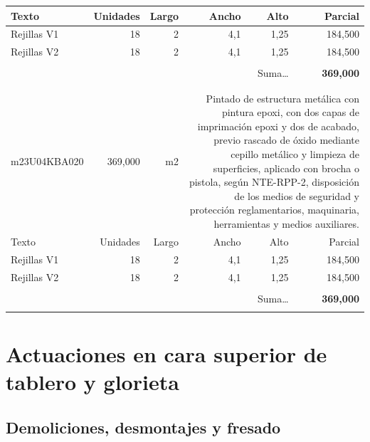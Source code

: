 \documentclass{book}%
\begin{document}
\begin{longtable}{lrrrrr}
Texto&Unidades&Largo&Ancho&Alto&Parcial\\%
\hline%
\multicolumn{1}{p{3.5cm}}{Rejillas V1}&18&2&4,1&1,25&   184,500\\%
\multicolumn{1}{p{3.5cm}}{Rejillas V2}&18&2&4,1&1,25&   184,500\\%
&&&&&\\%
\multicolumn{5}{r}{Suma\ldots}&\textbf{   369,000}\\%
\hline%
&&&&&\\%
&&&&&\\%
m23U04KBA020&   369,000& m2&\multicolumn{3}{p{6cm}}{\scriptsize Pintado de estructura metálica con pintura epoxi, con dos capas de imprimación epoxi y dos de acabado, previo rascado de óxido mediante cepillo metálico y limpieza de superficies, aplicado con brocha o pistola, según NTE-RPP-2, disposición de los medios de seguridad y protección reglamentarios, maquinaria, herramientas y medios auxiliares.\normalsize}\\%
Texto&Unidades&Largo&Ancho&Alto&Parcial\\%
\hline%
\multicolumn{1}{p{3.5cm}}{Rejillas V1}&18&2&4,1&1,25&   184,500\\%
\multicolumn{1}{p{3.5cm}}{Rejillas V2}&18&2&4,1&1,25&   184,500\\%
&&&&&\\%
\multicolumn{5}{r}{Suma\ldots}&\textbf{   369,000}\\%
\hline%
&&&&&\\%
\end{longtable}%
\newpage

%
\section{Actuaciones en cara superior de tablero y glorieta}%
\subsection{Demoliciones, desmontajes y fresado}%
\end{document}
